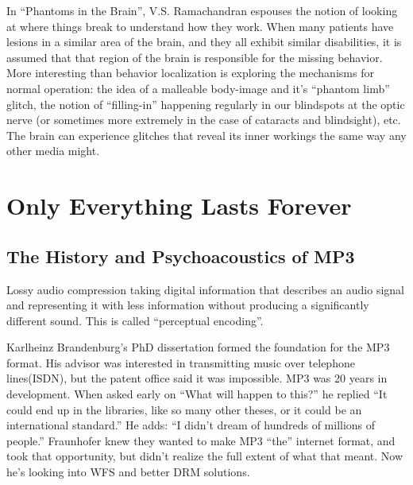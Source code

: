 \documentclass{thesis}
\begin{document}
	\cite{ramachandran_phantoms_1999}
	In ``Phantoms in the Brain'', V.S. Ramachandran espouses the notion of looking at where things break to understand how they work. When many patients have lesions in a similar area of the brain, and they all exhibit similar disabilities, it is assumed that that region of the brain is responsible for the missing behavior. More interesting than behavior localization is exploring the mechanisms for normal operation: the idea of a malleable body-image and it's ``phantom limb'' glitch, the notion of ``filling-in'' happening regularly in our blindspots at the optic nerve (or sometimes more extremely in the case of cataracts and blindsight), etc. The brain can experience glitches that reveal its inner workings the same way any other media might.
	
\chapter{Only Everything Lasts Forever}
\section{The History and Psychoacoustics of MP3}
Lossy audio compression taking digital information that describes an audio signal and representing it with less information without producing a significantly different sound. This is called ``perceptual encoding''.\cite{Ruckert05}

Karlheinz Brandenburg's PhD dissertation formed the foundation for the MP3 format. His advisor was interested in transmitting music over telephone lines(ISDN), but the patent office said it was impossible. MP3 was 20 years in development. When asked early on ``What will happen to this?'' he replied ``It could end up in the libraries, like so many other theses, or it could be an international standard.'' He adds: ``I didn't dream of hundreds of millions of people.'' Fraunhofer knew they wanted to make MP3 ``the'' internet format, and took that opportunity, but didn't realize the full extent of what that meant. Now he's looking into WFS and better DRM solutions.\cite{brandenburg_interviews_2004}
	
\end{document}
